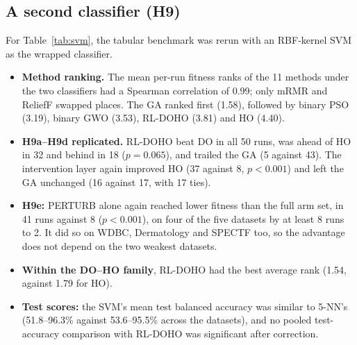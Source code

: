 \documentclass[pdflatex,sn-basic]{sn-jnl}
\begin{document}
\subsection{A second classifier (H9)}\label{sec:svm}
For Table~\ref{tab:svm}, the tabular benchmark was rerun with an RBF-kernel SVM as the wrapped classifier.
\begin{itemize}
\item \textbf{Method ranking.} The mean per-run fitness ranks of the 11 methods under the two classifiers had a Spearman correlation of 0.99; only mRMR and ReliefF swapped places. The GA ranked first (1.58), followed by binary PSO (3.19), binary GWO (3.53), RL-DOHO (3.81) and HO (4.40).
\item \textbf{H9a--H9d replicated.} RL-DOHO beat DO in all 50 runs, was ahead of HO in 32 and behind in 18 ($p=0.065$), and trailed the GA (5 against 43). The intervention layer again improved HO (37 against 8, $p<0.001$) and left the GA unchanged (16 against 17, with 17 ties).
\item \textbf{H9e:} PERTURB alone again reached lower fitness than the full arm set, in 41 runs against 8 ($p<0.001$), on four of the five datasets by at least 8 runs to 2. It did so on WDBC, Dermatology and SPECTF too, so the advantage does not depend on the two weakest datasets.
\item \textbf{Within the DO--HO family}, RL-DOHO had the best average rank (1.54, against 1.79 for HO).
\item \textbf{Test scores:} the SVM's mean test balanced accuracy was similar to 5-NN's (51.8--96.3\% against 53.6--95.5\% across the datasets), and no pooled test-accuracy comparison with RL-DOHO was significant after correction.
\end{itemize}
\end{document}
